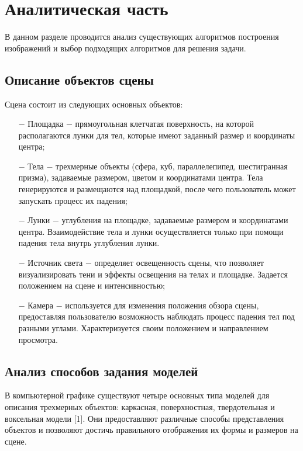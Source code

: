 \chapter{Аналитическая часть}

В данном разделе проводится анализ существующих алгоритмов построения изображений и выбор подходящих алгоритмов для решения задачи.

\section{Описание объектов сцены}

Сцена состоит из следующих основных объектов:

\begin{itemize}
	\item[$-$] Площадка $-$ прямоугольная клетчатая поверхность, на которой располагаются лунки для тел, которые имеют заданный размер и координаты центра;
    \item[$-$] Тела $-$ трехмерные объекты (сфера, куб, параллелепипед, шестигранная призма), задаваемые размером, цветом и координатами центра. Тела генерируются и размещаются над площадкой, после чего пользователь может запускать процесс их падения;
    \item[$-$] Лунки $-$ углубления на площадке, задаваемые размером и координатами центра. Взаимодействие тела и лунки осуществляется только при помощи падения тела внутрь углубления лунки.   
    \item[$-$] Источник света $-$ определяет освещенность сцены, что позволяет визуализировать тени и эффекты освещения на телах и площадке. Задается положением на сцене и интенсивностью;
    \item[$-$] Камера $-$ используется для изменения положения обзора сцены, предоставляя пользователю возможность наблюдать процесс падения тел под разными углами. Характеризуется своим положением и направлением просмотра.
\end{itemize}

\section{Анализ способов задания моделей}

В компьютерной графике существуют четыре основных типа моделей для
описания трехмерных объектов: каркасная, поверхностная, твердотельная
и воксельная модели [1]. Они предоставляют различные способы представления объектов и
позволяют достичь правильного отображения их формы и размеров на сцене.

